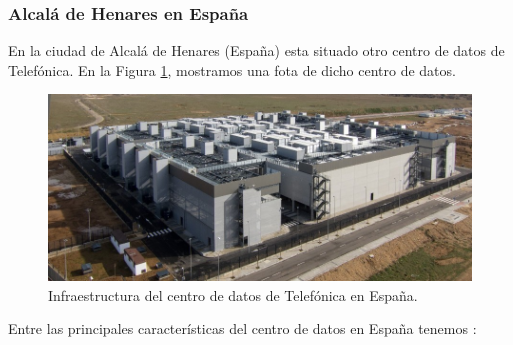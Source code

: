 \documentclass{article}
\begin{document}
	
	
	
\subsubsection{Alcalá de Henares en España}

En la ciudad de Alcalá de Henares (España) esta situado otro centro de datos de Telefónica. En la Figura \ref{img:spania}, mostramos una fota de dicho centro de datos. 

\begin{figure}[H]
	\centering
	\includegraphics[width=\textwidth]{img/datacenter/espania}	
	\caption{Infraestructura del centro de datos de Telefónica en España.}
	\label{img:spania}
\end{figure}

Entre las principales características del centro de datos en España tenemos \citep{telefonicaespania}:
\end{document}
